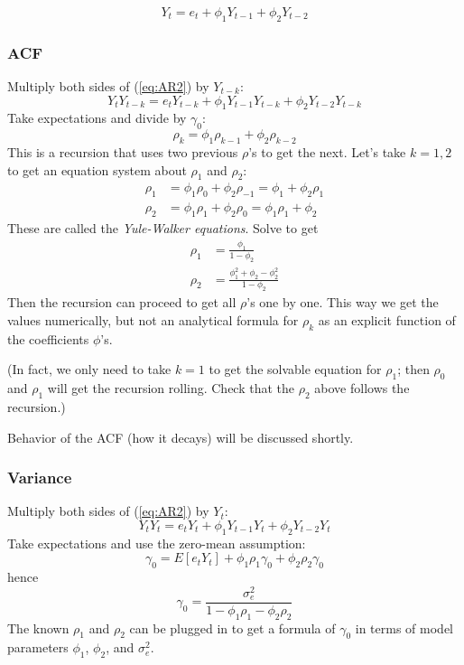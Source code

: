 \documentclass[12pt]{article}
\begin{document}
\begin{equation}\label{eq:AR2}
Y_t = e_t + \phi_1 Y_{t-1} + \phi_2 Y_{t-2}
\end{equation}

\subsubsection{ACF}

Multiply both sides of (\ref{eq:AR2}) by $Y_{t-k}$:
\[
Y_t Y_{t-k}
= e_t Y_{t-k} + \phi_1 Y_{t-1} Y_{t-k} + \phi_2 Y_{t-2} Y_{t-k}
\]
Take expectations and divide by $\gamma_0$:
\[
\rho_k = \phi_1 \rho_{k-1} + \phi_2 \rho_{k-2}
\]
This is a recursion that uses two previous $\rho$'s to get the next.
Let's take $k=1,2$ to get an equation system about $\rho_1$ and
$\rho_2$:
\[\begin{split}
\rho_1 &= \phi_1 \rho_0 + \phi_2 \rho_{-1} = \phi_1 + \phi_2 \rho_1
\\
\rho_2 &= \phi_1 \rho_1 + \phi_2 \rho_{0} = \phi_1 \rho_1 + \phi_2
\end{split}
\]
These are called the \emph{Yule-Walker equations}.
Solve to get
\[
\begin{split}
\rho_1 &= \frac{\phi_1}{1 - \phi_2}
\\
\rho_2 &= \frac{\phi_1^2 + \phi_2 - \phi_2^2}{1 - \phi_2}
\end{split}
\]
Then the recursion can proceed to get all $\rho$'s one by one.
This way we get the values numerically,
but not an analytical formula for $\rho_k$ as an explicit function
of the coefficients $\phi$'s.

(In fact, we only need to take $k=1$ to get the solvable equation for
$\rho_1$; then $\rho_0$ and $\rho_1$ will get the recursion rolling.
Check that the $\rho_2$ above follows the recursion.)

Behavior of the ACF (how it decays) will be discussed shortly.

\subsubsection{Variance}

Multiply both sides of (\ref{eq:AR2}) by $Y_t$:
\[
Y_t Y_t = e_t Y_t + \phi_1 Y_{t-1} Y_t + \phi_2 Y_{t-2} Y_t
\]
Take expectations and use the zero-mean assumption:
\[
\gamma_0 = E[e_t Y_t] + \phi_1 \rho_1 \gamma_0 + \phi_2 \rho_2 \gamma_0
\]
hence
\[
\gamma_0
= \frac{\sigma_e^2}{1 - \phi_1 \rho_1 - \phi_2 \rho_2}
\]
The known $\rho_1$ and $\rho_2$ can be plugged in
to get a formula of $\gamma_0$ in terms of
model parameters $\phi_1$, $\phi_2$, and $\sigma^2_e$.
\end{document}
